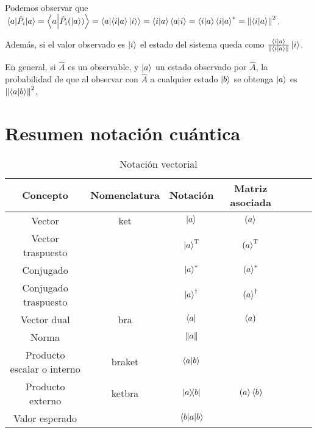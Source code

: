Podemos observar que $\ev{\hat{P}_i}{a}=\braket{a}{\hat{P}_i(\ket{a})}=\braket{a}{\braket{i}{a}\ket{i}}=\braket{i}{a}\braket{a}{i}=\braket{i}{a}\braket{i}{a}^*=\norm{\braket{i}{a}}^2$.

Además, si el valor observado es $\ket{i}$ el estado del sistema queda como $\frac{\braket{i}{a}}{\norm{\braket{i}{a}}}\ket{i}$.

En general, si $\hat{A}$ es un observable, y $\ket{a}$ un estado observado por $\hat{A}$, la probabilidad de que al observar con $\hat{A}$ a cualquier estado $\ket{b}$ se obtenga $\ket{a}$ es $\norm{\braket{a}{b}}^2$.

\section{Resumen notación cuántica}\label{sec:resumen-notacion-cuantica}
\begin{table}[htbp]
	\caption{Notación vectorial\label{tab:notacion-vectorial}}
	\centering
	\begin{tabular}{ccccccc}
		\toprule
		Concepto                 & Nomenclatura & Notación              & Matriz asociada        \\
		\midrule
		Vector                     & ket          & $\ket{a}$             & $\left(a\right>$             \\
		Vector traspuesto          &              & $\ket{a}^\text{T}$ & $\left(a\right>^\text{T}$ \\
		Conjugado                  &              & $\ket{a}^*$           & $\left(a\right>^*$           \\
		Conjugado traspuesto       &              & $\ket{a}^\dag$        & $\left(a\right>^\dag$        \\
		Vector dual                & bra          & $\bra{a}$             & $\left<a\right)$             \\
		Norma                      &              & $\norm{a}$            &                        \\
		Producto escalar o interno & braket       & $\braket{a}{b}$       &                        \\
		Producto externo           & ketbra       & $\ketbra{a}{b}$       & $\left(a\right>\left<b\right)$       \\
		Valor esperado             &              & $\ev{a}{b}$           &                        \\
		\bottomrule
	\end{tabular}
\end{table}